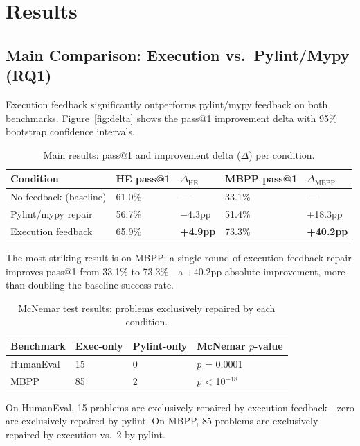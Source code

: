 \section{Results}
\label{sec:results}

\subsection{Main Comparison: Execution vs.\ Pylint/Mypy (RQ1)}

Execution feedback significantly outperforms pylint/mypy feedback on both benchmarks. Figure~\ref{fig:delta} shows the pass@1 improvement delta with 95\% bootstrap confidence intervals.

\begin{table}[h]
\centering
\caption{Main results: pass@1 and improvement delta ($\Delta$) per condition.}
\label{tab:main}
\begin{tabular}{lllll}
\toprule
\textbf{Condition} & \textbf{HE pass@1} & \textbf{$\Delta_{\text{HE}}$} & \textbf{MBPP pass@1} & \textbf{$\Delta_{\text{MBPP}}$} \\
\midrule
No-feedback (baseline) & 61.0\% & --- & 33.1\% & --- \\
Pylint/mypy repair & 56.7\% & $-$4.3pp & 51.4\% & +18.3pp \\
Execution feedback & 65.9\% & \textbf{+4.9pp} & 73.3\% & \textbf{+40.2pp} \\
\bottomrule
\end{tabular}
\end{table}

The most striking result is on MBPP: a single round of execution feedback repair improves pass@1 from 33.1\% to 73.3\%---a +40.2pp absolute improvement, more than doubling the baseline success rate.

\begin{table}[h]
\centering
\caption{McNemar test results: problems exclusively repaired by each condition.}
\label{tab:mcnemar}
\begin{tabular}{llll}
\toprule
\textbf{Benchmark} & \textbf{Exec-only} & \textbf{Pylint-only} & \textbf{McNemar $p$-value} \\
\midrule
HumanEval & 15 & 0 & $p$ = 0.0001 \\
MBPP & 85 & 2 & $p$ < 10$^{-18}$ \\
\bottomrule
\end{tabular}
\end{table}

On HumanEval, 15 problems are exclusively repaired by execution feedback---zero are exclusively repaired by pylint. On MBPP, 85 problems are exclusively repaired by execution vs.\ 2 by pylint.

